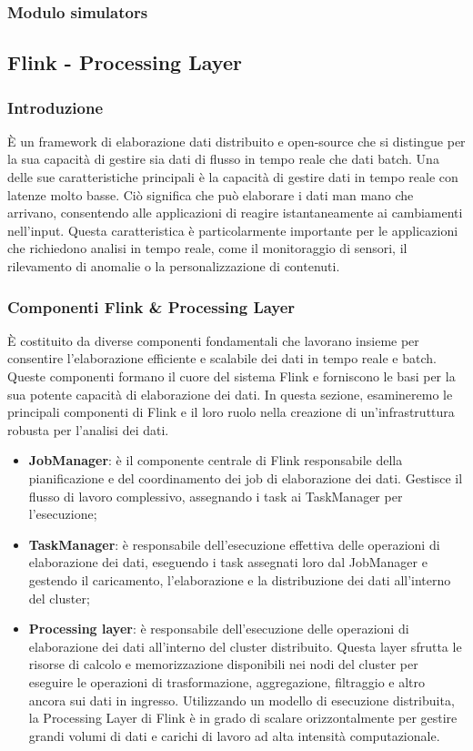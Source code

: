 \subsubsection{Modulo simulators}

\subsection{Flink - Processing Layer}
\subsubsection{Introduzione}
È un framework di elaborazione dati distribuito e open-source che si distingue per la sua capacità di gestire sia dati di flusso in tempo reale che dati batch. Una delle sue caratteristiche principali è la capacità di gestire dati in tempo reale con latenze molto basse. Ciò significa che può elaborare i dati man mano che arrivano, consentendo alle applicazioni di reagire istantaneamente ai cambiamenti nell'input. Questa caratteristica è particolarmente importante per le applicazioni che richiedono analisi in tempo reale, come il monitoraggio di sensori, il rilevamento di anomalie o la personalizzazione di contenuti.
\subsubsection{Componenti Flink \& Processing Layer}
È costituito da diverse componenti fondamentali che lavorano insieme per consentire l'elaborazione efficiente e scalabile dei dati in tempo reale e batch. Queste componenti formano il cuore del sistema Flink e forniscono le basi per la sua potente capacità di elaborazione dei dati. In questa sezione, esamineremo le principali componenti di Flink e il loro ruolo nella creazione di un'infrastruttura robusta per l'analisi dei dati.
\begin{itemize}
    \item \textbf{JobManager}: è il componente centrale di Flink responsabile della pianificazione e del coordinamento dei job di elaborazione dei dati. Gestisce il flusso di lavoro complessivo, assegnando i task ai TaskManager per l'esecuzione;
    \item \textbf{TaskManager}: è responsabile dell'esecuzione effettiva delle operazioni di elaborazione dei dati, eseguendo i task assegnati loro dal JobManager e gestendo il caricamento, l'elaborazione e la distribuzione dei dati all'interno del cluster;
    \item \textbf{Processing layer}: è responsabile dell'esecuzione delle operazioni di elaborazione dei dati all'interno del cluster distribuito. Questa layer sfrutta le risorse di calcolo e memorizzazione disponibili nei nodi del cluster per eseguire le operazioni di trasformazione, aggregazione, filtraggio e altro ancora sui dati in ingresso. Utilizzando un modello di esecuzione distribuita, la Processing Layer di Flink è in grado di scalare orizzontalmente per gestire grandi volumi di dati e carichi di lavoro ad alta intensità computazionale.
\end{itemize}
